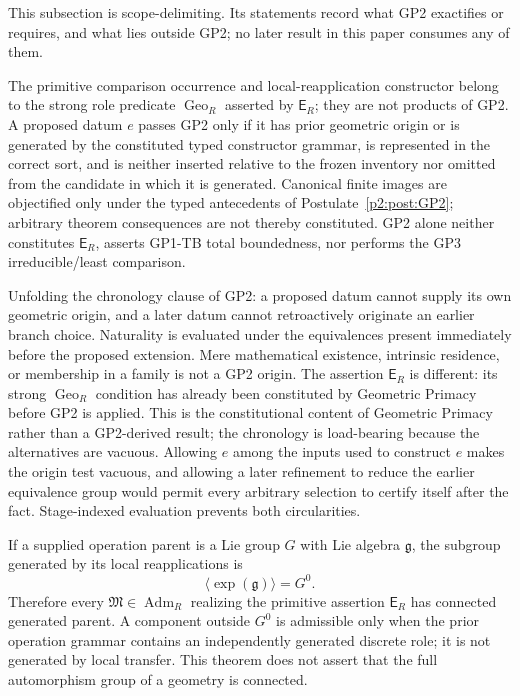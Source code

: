 \documentclass[11pt,a4paper]{article}
\begin{document}
This subsection is scope-delimiting.  Its statements record what GP2
exactifies or requires, and what lies outside GP2; no later result in this paper consumes any of them.

\begin{remark}
\label{p2:rem:gp2-origin-filter-alone}
The primitive comparison occurrence and local-reapplication constructor belong
to the strong role predicate \(\operatorname{Geo}_R\) asserted by
\(\mathsf E_R\); they are not products of GP2.  A proposed datum
\(e\) passes GP2 only if it has prior geometric origin or is generated by the
constituted typed constructor grammar, is represented in the correct sort, and
is neither inserted relative to the frozen inventory nor omitted from the
candidate in which it is generated.  Canonical finite images are objectified only under the typed
antecedents of Postulate~\ref{p2:post:GP2}; arbitrary theorem consequences are
not thereby constituted.  GP2 alone neither constitutes \(\mathsf E_R\),
asserts GP1-TB total boundedness, nor performs the GP3 irreducible/least
comparison.
\end{remark}

\begin{remark}
\label{p2:rem:gp2-chronological-origin-alone}
Unfolding the chronology clause of GP2: a proposed datum cannot supply its own
geometric origin, and a later datum cannot retroactively originate an earlier
branch choice.  Naturality is evaluated under the equivalences present
immediately before the proposed extension.  Mere mathematical existence,
intrinsic residence, or membership in a family is not a GP2 origin.  The
assertion \(\mathsf E_R\) is different: its strong
\(\operatorname{Geo}_R\) condition has already been constituted by Geometric
Primacy before GP2 is applied.  This is the constitutional content of
Geometric Primacy rather than a GP2-derived result; the chronology is
load-bearing because the
alternatives are vacuous.  Allowing \(e\) among the inputs used to construct
\(e\) makes the origin test vacuous, and allowing a later refinement to reduce
the earlier equivalence group would permit every arbitrary selection to certify
itself after the fact.  Stage-indexed evaluation prevents both circularities.
\end{remark}

\begin{theorem}
\label{p2:thm:gp2-local-closure-connectedness}
If a supplied operation parent is a Lie group \(G\) with Lie algebra
\(\mathfrak g\), the subgroup generated by its local reapplications is
\[
 \langle\exp(\mathfrak g)\rangle=G^0.
\]
Therefore every \(\mathfrak M\in\operatorname{Adm}_R\) realizing the primitive
assertion \(\mathsf E_R\) has connected generated parent.  A component
outside \(G^0\) is admissible only when the prior operation grammar contains an
independently generated discrete role; it is not generated by local transfer.
This theorem does not assert that the full automorphism group of a geometry is
connected.
\end{theorem}
\end{document}
